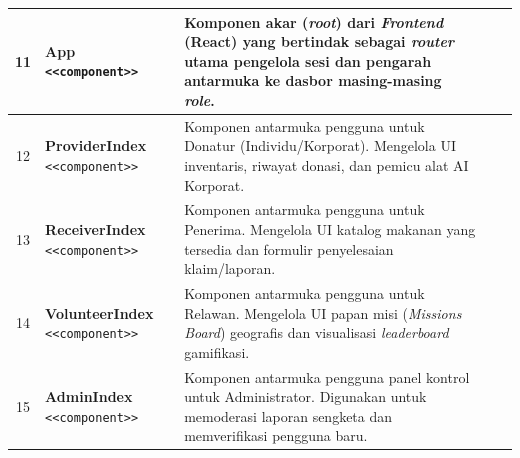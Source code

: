 \begin{xltabular}{\textwidth}{|c|L|L|L|L|}
    11 & \textbf{App} \newline \texttt{<<component>>} & Komponen akar (\textit{root}) dari \textit{Frontend} (React) yang bertindak sebagai \textit{router} utama pengelola sesi dan pengarah antarmuka ke dasbor masing-masing \textit{role}. &  &  \\
    \hline

    12 & \textbf{ProviderIndex} \newline \texttt{<<component>>} & Komponen antarmuka pengguna untuk Donatur (Individu/Korporat). Mengelola UI inventaris, riwayat donasi, dan pemicu alat AI Korporat. &  &  \\
    \hline

    13 & \textbf{ReceiverIndex} \newline \texttt{<<component>>} & Komponen antarmuka pengguna untuk Penerima. Mengelola UI katalog makanan yang tersedia dan formulir penyelesaian klaim/laporan. &  &  \\
    \hline

    14 & \textbf{VolunteerIndex} \newline \texttt{<<component>>} & Komponen antarmuka pengguna untuk Relawan. Mengelola UI papan misi (\textit{Missions Board}) geografis dan visualisasi \textit{leaderboard} gamifikasi. &  &  \\
    \hline

    15 & \textbf{AdminIndex} \newline \texttt{<<component>>} & Komponen antarmuka pengguna panel kontrol untuk Administrator. Digunakan untuk memoderasi laporan sengketa dan memverifikasi pengguna baru. &  &  \\
    \hline

\end{xltabular}
\fi

